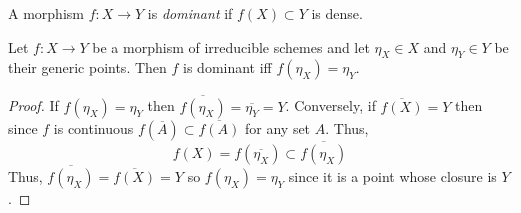 \documentclass[12pt]{article}
\begin{document}
\begin{definition}
A morphism $f : X \to Y$ is \textit{dominant} if $f(X) \subset Y$ is dense.
\end{definition}

\begin{lemma}
Let $f : X \to Y$ be a morphism of irreducible schemes and let $\eta_X \in X$ and $\eta_Y \in Y$ be their generic points. Then $f$ is dominant iff $f(\eta_X) = \eta_Y$.
\end{lemma}

\begin{proof}
If $f(\eta_X) = \eta_Y$ then $\overline{f(\eta_X)} = \overline{\eta_Y} = Y$. Conversely, if $\overline{f(X)} = Y$ then since $f$ is continuous $f(\overline{A}) \subset \overline{f(A)}$ for any set $A$. Thus,
\[ f(X) = f(\overline{\eta_X}) \subset \overline{f(\eta_X)} \]
Thus, $\overline{f(\eta_X)} = \overline{f(X)} = Y$ so $f(\eta_X) = \eta_Y$ since it is a point whose closure is $Y$.
\end{proof}
\end{document}
